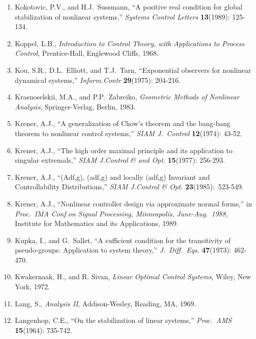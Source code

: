 \begin{enumerate}
\item
Kokotovic, P.V., and H.J.\ Sussmann, ``A positive real condition for global
stabilization of nonlinear systems,'' {\it Systems Control Letters} {\bf
13}(1989): 125-134.

\item
Koppel, L.B., {\it Introduction to Control Theory, with Applications to
Process Control}, Prentice-Hall, Englewood Cliffs, 1968.

\item
Kou, S.R., D.L.\ Elliott, and T.J.\ Tarn, ``Exponential observers for
nonlinear dynamical systems,'' {\it Inform.Contr} {\bf 29}(1975): 204-216.

\item
Krasnoselskii, M.A., and P.P.\ Zabreiko, {\it Geometric Methods of Nonlinear
Analysis}, Springer-Verlag, Berlin, 1983.

\item
Krener, A.J., ``A generalization of Chow's theorem and the bang-bang theorem
to nonlinear control systems,'' {\it SIAM J.\ Control} {\bf 12}(1974): 43-52.

\item
Krener, A.J., ``The high order maximal principle and its application to
singular extremals,'' {\it SIAM J.Control \& and Opt.} {\bf 15}(1977):
256-293.

\item
Krener, A.J., ``(Adf,g), (adf,g) and locally (adf,g) Invariant and
Controllability Distributions,'' {\it SIAM J.Control \& Opt.} {\bf 23}(1985):\
523-549.

\item
Krener, A.J., ``Nonlinear controller design via approximate normal forms,'' in
{\it Proc.\ IMA Conf.on Signal Processing, Minneapolis, June-Aug.\ 1988},
Institute for Mathematics and its Applications, 1989.

\item
Kupka, I., and G.\ Sallet, ``A sufficient condition for the transitivity of
pseudo-groups: Application to system theory,'' {\it J.~Diff.~Eqs.} {\bf
47}(1973): 462-470.

\item
Kwakernaak, H., and R. Sivan, {\it Linear Optimal Control Systems}, Wiley, New
York, 1972.

\item
Lang, S., {\it Analysis II}, Addison-Wesley, Reading, MA, 1969.

\item
Langenhop, C.E., ``On the stabilization of linear systems,'' {\it Proc.\ AMS}
{\bf 15}(1964): 735-742.


\end{enumerate}
